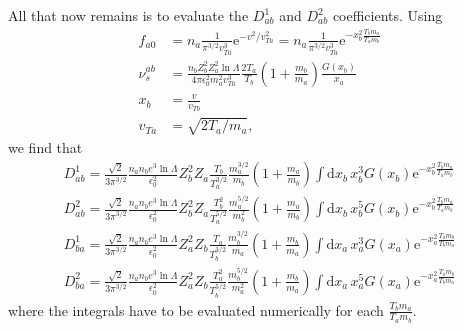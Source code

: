 \documentclass[12pt, a4paper]{article}
\newcommand{\e}{\ensuremath{\mathrm{e}}}
\renewcommand{\d}{\ensuremath{\mathrm{d}}}
\begin{document}
All that now remains is to evaluate the $D^1_{ab}$ and $D^2_{ab}$ coefficients. Using
\begin{align}
  f_{a0} &= n_a \frac{1}{\pi^{3/2} v_{Ta}^3} \e^{-v^2/v_{Ta}^2} = n_a \frac{1}{\pi^{3/2} v_{Ta}^3} \e^{-x_b^2 \frac{T_b m_a}{T_a m_b}} \\
  \nu_{s}^{ab} &= \frac{n_b Z_b^2 Z_a^2 \ln \Lambda}{4 \pi \epsilon_0^2 m_a^2 v_{Ta}^3} \frac{2T_a}{T_b} \left(1 + \frac{m_b}{m_a}\right) \frac{G(x_b)}{x_a} \\
  x_b &= \frac{v}{v_{Tb}} \\
  v_{Ta} &= \sqrt{2T_a/m_a},
\end{align}
we find that
\begin{align}
  D^1_{ab} = \frac{\sqrt{2}}{3\pi^{3/2}} \frac{n_a n_b  e^3 \ln \Lambda}{\epsilon_0^2 } Z_b^2 Z_a \frac{T_b}{T_a^{3/2}} \frac{m_a^{3/2}}{m_b}\left(1 + \frac{m_a}{m_b} \right) \int \d x_b\, x_b^3 G(x_b) \e^{-x_b^2 \frac{T_b m_a}{T_a m_b}} \\
  D^2_{ab} = \frac{\sqrt{2}}{3\pi^{3/2}} \frac{n_a n_b e^3 \ln \Lambda}{\epsilon_0^2 } Z_b^2 Z_a  \frac{T_b^2}{T_a^{5/2}} \frac{m_a^{5/2}}{m_b^2} \left(1 + \frac{m_a}{m_b}\right) \int \d x_b\, x_b^5 G(x_b) \e^{-x_b^2 \frac{T_b m_a}{T_a m_b}} \\
  D^1_{ba} = \frac{\sqrt{2}}{3\pi^{3/2}} \frac{n_a n_b  e^3 \ln \Lambda}{\epsilon_0^2 } Z_a^2 Z_b \frac{T_a}{T_b^{3/2}} \frac{m_b^{3/2}}{m_a}\left(1 + \frac{m_b}{m_a} \right) \int \d x_a\, x_a^3 G(x_a) \e^{-x_a^2 \frac{T_a m_b}{T_b m_a}} \\
D^2_{ba} = \frac{\sqrt{2}}{3\pi^{3/2}} \frac{n_a n_b e^3 \ln \Lambda}{\epsilon_0^2 }  Z_a^2 Z_b \frac{T_a^2}{T_b^{5/2}} \frac{m_b^{5/2}}{m_a^2} \left(1 + \frac{m_b}{m_a}\right) \int \d x_a\, x_a^5 G(x_a) \e^{-x_a^2 \frac{T_a m_b}{T_b m_a}} 
\end{align}
where the integrals have to be evaluated numerically for each $\frac{T_b m_a}{T_a m_b}$. 
\end{document}
